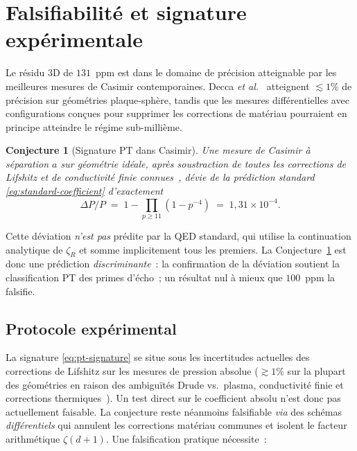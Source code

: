\documentclass[11pt,a4paper]{article}
\newtheorem{conjecture}{Conjecture}
\newcommand{\zetaR}{\zeta_R}
\begin{document}
\section{Falsifiabilité et signature expérimentale}
\label{sec:falsifiability}

Le résidu 3D de $131$~ppm est dans le domaine de précision atteignable par les meilleures mesures
de Casimir contemporaines. Decca \emph{et al.}~\cite{Decca2007,Decca2003} atteignent
$\lesssim 1\%$ de précision sur géométries plaque-sphère, tandis que les mesures différentielles
avec configurations conçues pour supprimer les corrections de matériau pourraient en principe
atteindre le régime sub-millième.

\begin{conjecture}[Signature PT dans Casimir]
\label{conj:pt-signature}
Une mesure de Casimir à séparation $a$ sur géométrie idéale, après soustraction de toutes les
corrections de Lifshitz et de conductivité finie connues~\cite{Lifshitz1956}, dévie de la
prédiction standard \eqref{eq:standard-coefficient} d'exactement
\begin{equation}
\Delta P / P \;=\; 1 - \prod_{p \geq 11}(1 - p^{-4}) \;=\; 1{,}31 \times 10^{-4}.
\label{eq:pt-signature}
\end{equation}
\end{conjecture}

Cette déviation \emph{n'est pas} prédite par la QED standard, qui utilise la continuation
analytique de $\zetaR$ et somme implicitement tous les premiers. La
Conjecture~\ref{conj:pt-signature} est donc une prédiction \emph{discriminante}~: la confirmation
de la déviation soutient la classification PT des primes d'écho~; un résultat nul à mieux que
$100$~ppm la falsifie.

\subsection{Protocole expérimental}

La signature \eqref{eq:pt-signature} se situe sous les incertitudes actuelles des corrections
de Lifshitz sur les mesures de pression absolue ($\gtrsim 1\%$ sur la plupart des géométries
en raison des ambiguïtés Drude vs.\ plasma, conductivité finie et corrections
thermiques~\cite{Klimchitskaya2009}). Un test direct sur le coefficient absolu n'est donc pas
actuellement faisable. La conjecture reste néanmoins falsifiable \emph{via} des schémas
\emph{différentiels} qui annulent les corrections matériau communes et isolent le facteur
arithmétique $\zeta(d+1)$. Une falsification pratique nécessite~:
\end{document}
